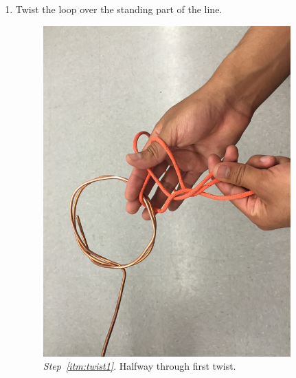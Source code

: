 \documentclass[12pt]{article}
\begin{document}
\begin{enumerate}
\clearpage

\item \label{itm:twist1} Twist the loop over the standing part of the line.

\begin{figure}[ht!]
    \centering
    \includegraphics[width=0.9\textwidth]{pic3.png}
    \caption{\textit{Step~\ref{itm:twist1}}. Halfway through first twist.}
    \label{fig:pic3}
 \end{figure}



\end{enumerate}
\end{document}
